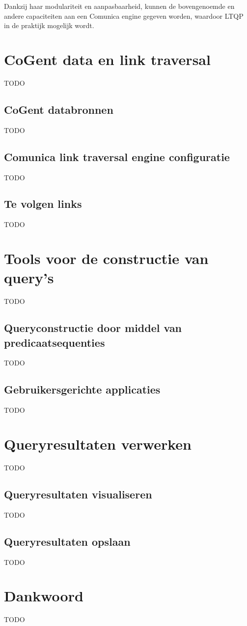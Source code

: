 \documentclass[conference]{IEEEtran}
\begin{document}
Dankzij haar modulariteit en aanpasbaarheid, kunnen de bovengenoemde en andere capaciteiten aan een Comunica engine gegeven worden, waardoor LTQP in de praktijk mogelijk wordt. \cite{taelman2018comunica} \cite{taelman2019lt}

\section{CoGent data en link traversal}
TODO

\subsection{CoGent databronnen}
TODO

\subsection{Comunica link traversal engine configuratie}
TODO

\subsection{Te volgen links}
TODO

\section{Tools voor de constructie van query's}
TODO

\subsection{Queryconstructie door middel van predicaatsequenties}
TODO

\subsection{Gebruikersgerichte applicaties}
TODO

\section{Queryresultaten verwerken}
TODO

\subsection{Queryresultaten visualiseren}
TODO

\subsection{Queryresultaten opslaan}
TODO

\section*{Dankwoord}
TODO



\end{document}
